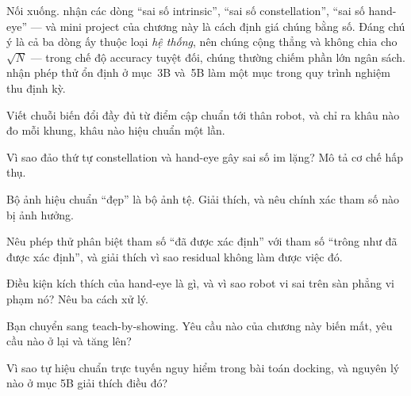 \documentclass[../../marker.tex]{subfiles}
\begin{document}
Nối xuống.  nhận các dòng ``sai số intrinsic'', ``sai số constellation'', ``sai số hand-eye'' --- và mini project của chương này là cách định giá chúng bằng số. Đáng chú ý là cả ba dòng ấy thuộc loại \emph{hệ thống}, nên chúng cộng thẳng và không chia cho \(\sqrt{N}\) --- trong chế độ accuracy tuyệt đối, chúng thường chiếm phần lớn ngân sách.  nhận phép thử ổn định ở mục~3B và~5B làm một mục trong quy trình nghiệm thu định kỳ.

\begin{tukiem}
\item Viết chuỗi biến đổi đầy đủ từ điểm cập chuẩn tới thân robot, và chỉ ra khâu nào đo mỗi khung, khâu nào hiệu chuẩn một lần.
\item Vì sao đảo thứ tự constellation và hand-eye gây sai số im lặng? Mô tả cơ chế hấp thụ.
\item Bộ ảnh hiệu chuẩn ``đẹp'' là bộ ảnh tệ. Giải thích, và nêu chính xác tham số nào bị ảnh hưởng.
\item Nêu phép thử phân biệt tham số ``đã được xác định'' với tham số ``trông như đã được xác định'', và giải thích vì sao residual không làm được việc đó.
\item Điều kiện kích thích của hand-eye là gì, và vì sao robot vi sai trên sàn phẳng vi phạm nó? Nêu ba cách xử lý.
\item Bạn chuyển sang teach-by-showing. Yêu cầu nào của chương này biến mất, yêu cầu nào ở lại và tăng lên?
\item Vì sao tự hiệu chuẩn trực tuyến nguy hiểm trong bài toán docking, và nguyên lý nào ở mục 5B giải thích điều đó?
\end{tukiem}
\ifSubfilesClassLoaded{\printbibliography[title={Nguồn}]}{}
\end{document}
